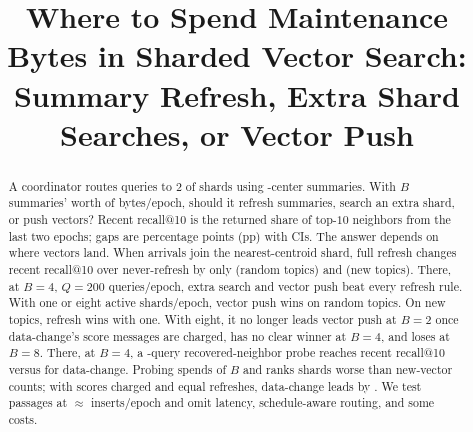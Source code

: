 \documentclass[conference]{IEEEtran}
\newif\ifanonymous
\begin{document}
\setlength{\textfloatsep}{2pt plus 1pt minus 1pt}
\setlength{\floatsep}{2pt plus 1pt minus 1pt}
\setlength{\dbltextfloatsep}{2pt plus 1pt minus 1pt}
\setlength{\abovecaptionskip}{1pt plus 1pt minus 1pt}
\setlength{\belowcaptionskip}{0pt}
\setlength{\aboverulesep}{0.8pt}
\setlength{\belowrulesep}{0.8pt}

\title{Where to Spend Maintenance Bytes in Sharded Vector Search: Summary Refresh, Extra Shard Searches, or Vector Push}

\ifanonymous
\author{\IEEEauthorblockN{Anonymous Authors}}
\else
\author{
}
\fi

\maketitle

\begin{abstract}
A coordinator routes queries to $2$ of \RNumNumShards{} shards using \RNumCentersPerSummary{}-center summaries. With $B$ summaries' worth of bytes/epoch, should it refresh summaries, search an extra shard, or push vectors? Recent recall@10 is the returned share of top-$10$ neighbors from the last two epochs; gaps are percentage points (pp) with \RNumCIPct{} CIs. The answer depends on where vectors land. When arrivals join the nearest-centroid shard, full refresh changes recent recall@10 over never-refresh by only \RNumHOneGapSteady{} (random topics) and \RNumHOneGapNewTopic{} (new topics). There, at $B{=}4$, $Q{=}200$ queries/epoch, extra search and vector push beat every refresh rule. With one or eight active shards/epoch, vector push wins on random topics. On new topics, refresh wins with one. With eight, it no longer leads vector push at $B{=}2$ once data-change's score messages are charged, has no clear winner at $B{=}4$, and loses at $B{=}8$. There, at $B{=}4$, a \RNumSampleQueries{}-query recovered-neighbor probe reaches \RNumMThreeRNRecentBFourNewTopic{} recent recall@10 versus \RNumMThreeDCRecentBFourNewTopic{} for data-change. Probing spends \RNumRNOverheadShareBFour{} of $B$ and ranks shards worse than new-vector counts; with scores charged and equal refreshes, data-change leads by \RNumAddThreeXOneRNBFourNewTopic{}. We test \RNumCorpusTotalPassages{} passages at $\approx$\RNumSteadyEpochInsertVecs{} inserts/epoch and omit latency, schedule-aware routing, and some costs.
\end{abstract}
\end{document}
